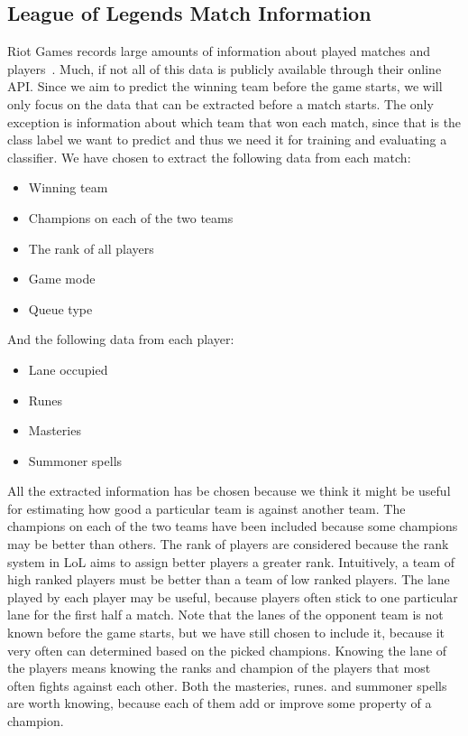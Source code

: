\subsection{League of Legends Match Information}\label{sec:matchdata}
Riot Games records large amounts of information about played matches and players~\cite{matchinfo}. Much, if not all of this data is publicly available through their online API. Since we aim to predict the winning team before the game starts, we will only focus on the data that can be extracted before a match starts. The only exception is information about which team that won each match, since that is the class label we want to predict and thus we need it for training and evaluating a classifier.
We have chosen to extract the following data from each match:
\begin{itemize}
\item Winning team
\item Champions on each of the two teams
\item The rank of all players
\item Game mode
\item Queue type
\end{itemize}
And the following data from each player:
\begin{itemize}
\item Lane occupied 
\item Runes 
\item Masteries 
\item Summoner spells 
\end{itemize}
All the extracted information has be chosen because we think it might be useful for estimating how good a particular team is against another team. 
The champions on each of the two teams have been included because some champions may be better than others.
The rank of players are considered because the rank system in LoL aims to assign better players a greater rank. Intuitively, a team of high ranked players must be better than a team of low ranked players.
The lane played by each player may be useful, because players often stick to one particular lane for the first half a match.
Note that the lanes of the opponent team is not known before the game starts, but we have still chosen to include it, because it very often can determined based on the picked champions. Knowing the lane of the players means knowing the ranks and champion of the players that most often fights against each other.
Both the masteries, runes. and summoner spells are worth knowing, because each of them add or improve some property of a champion. 
